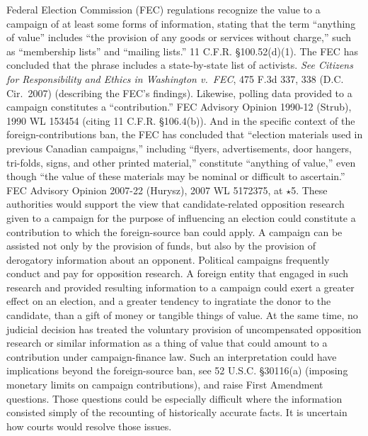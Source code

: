 Federal Election Commission (FEC) regulations recognize the value to a campaign of at least some forms of information, stating that the term ``anything of value'' includes ``the provision of any goods or services without charge,'' such as ``membership lists'' and ``mailing lists.''
11 C.F.R. \S 100.52(d)(1).
The FEC has concluded that the phrase includes a state-by-state list of activists.
\textit{See Citizens for Responsibility and Ethics in Washington v.\ FEC}, 475 F.3d 337, 338 (D.C. Cir.~2007) (describing the FEC's findings).
Likewise, polling data provided to a campaign constitutes a ``contribution.''
FEC Advisory Opinion 1990-12 (Strub), 1990 WL 153454 (citing 11 C.F.R. \S 106.4(b)).
And in the specific context of the foreign-contributions ban, the FEC has concluded that ``election materials used in previous Canadian campaigns,'' including ``flyers, advertisements, door hangers, tri-folds, signs, and other printed material,'' constitute ``anything of value,'' even though ``the value of these materials may be nominal or difficult to ascertain.''
FEC Advisory Opinion 2007-22 (Hurysz), 2007 WL 5172375, at $\star$5.
These authorities would support the view that candidate-related opposition research given to a campaign for the purpose of influencing an election could constitute a contribution to which the foreign-source ban could apply.
A campaign can be assisted not only by the provision of funds, but also by the provision of derogatory information about an opponent.
Political campaigns frequently conduct and pay for opposition research.
A foreign entity that engaged in such research and provided resulting information to a campaign could exert a greater effect on an election, and a greater tendency to ingratiate the donor to the candidate, than a gift of money or tangible things of value.
At the same time, no judicial decision has treated the voluntary provision of uncompensated opposition research or similar information as a thing of value that could amount to a contribution under campaign-finance law.
Such an interpretation could have implications beyond the foreign-source ban, see 52 U.S.C. \S 30116(a) (imposing monetary limits on campaign contributions), and raise First Amendment questions.
Those questions could be especially difficult where the information consisted simply of the recounting of historically accurate facts.
It is uncertain how courts would resolve those issues.

